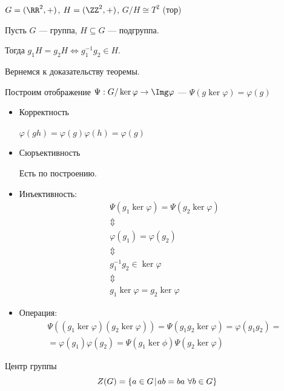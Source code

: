 \begin{exercise}{}{}
    \( G = (\RR^2, +) \), \( H = (\ZZ^2, +) \), \( G / H \cong T^2 \) (тор)
\end{exercise}

\begin{exercise}{}{}
    Пусть \( G \) --- группа, \( H \subseteq G \) --- подгруппа.

    Тогда \( g_1 H = g_2 H \Leftrightarrow g_1^{-1} g_2 \in H \).
\end{exercise}

Вернемся к доказательству теоремы.

Построим отображение \( \Psi : G / \ker \varphi \to \Img \varphi \) --- \( \Psi( g \ker \varphi) = \varphi(g) \)

\begin{itemize}
    \item
        Корректность

        \( \varphi (gh) = \varphi(g) \varphi(h) = \varphi(g) \)
    \item
        Сюръективность

        Есть по построению.
    \item
        Инъективность:
        \begin{gather*}
            \Psi(g_1 \ker \varphi) = \Psi(g_2 \ker \varphi)
            \\
            \Updownarrow
            \\
            \varphi(g_1) = \varphi(g_2)
            \\
            \Updownarrow
            \\
            g_1^{-1} g_2 \in \ker \varphi
            \\
            \Updownarrow
            \\
            g_1 \ker \varphi = g_2 \ker \varphi
        \end{gather*}
    \item
        Операция:
        \begin{gather*}
            \Psi( (g_1 \ker \varphi) (g_2 \ker \varphi) )
            =
            \Psi(g_1 g_2 \ker \varphi)
            =
            \varphi(g_1 g_2)
            =
            \\
            =
            \varphi(g_1) \varphi(g_2)
            =
            \Psi(g_1 \ker \phi) \Psi(g_2 \ker \varphi)
        \end{gather*}
\end{itemize}

\begin{defn}{Центр группы}{}
    \[
        Z(G) = \{ a \in G \: \vline \: ab = ba \ \forall b \in G \}
    \]
\end{defn}

